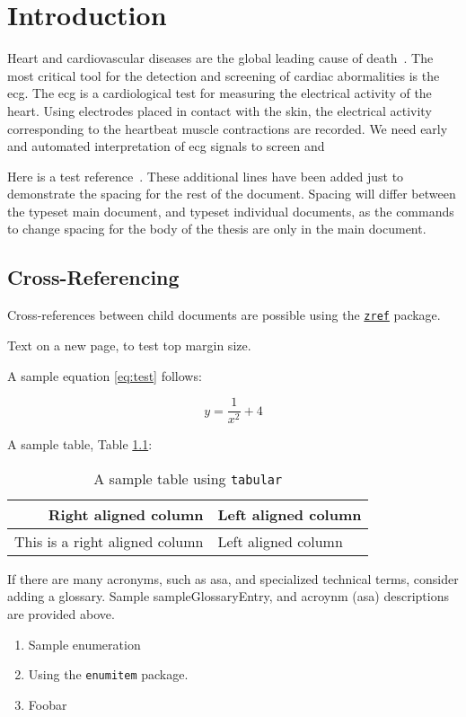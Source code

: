 \documentclass[\main/thesis.tex]{subfiles}
\begin{document}
\chapter{Introduction}

Heart and cardiovascular diseases are the global leading cause of death~\cite{doi:10.1161/CIR.0000000000000757}.
The most critical tool for the detection and screening of cardiac abormalities is the \gls{ecg}.
The \gls{ecg} is a cardiological test for measuring the electrical activity of the heart.
Using electrodes placed in contact with the skin, the electrical activity corresponding to the heartbeat muscle contractions are recorded.
We need early and automated interpretation of \gls{ecg} signals to screen and 

Here is a test reference~\cite{Knuth68:art_of_programming}.
These additional lines have been added just to demonstrate the spacing
for the rest of the document. Spacing will differ between the typeset main
document, and typeset individual documents, as the commands
to change spacing for the body of the thesis are only in the main document.

\section{Cross-Referencing}\label{sec:crossRef}

Cross-references between child documents are possible using the
\href{https://www.ctan.org/pkg/zref}{\texttt{zref}} package.

\newpage

Text on a new page, to test top margin size.

A sample equation \eqref{eq:test} follows:

\begin{equation}
y = \frac{1}{x^2} + 4 \label{eq:test}
\end{equation}

A sample table, Table \ref{tab:test}:

\begin{table}[h]
    \centering
    \begin{tabular}{r|l}
    \textbf{Right aligned column} & \textbf{Left aligned column} \\ \hline
    This is a right aligned column & Left aligned column
    \end{tabular}
    \caption{A sample table using \texttt{tabular}}
    \label{tab:test}
\end{table}

If there are many acronyms, such as \gls{asa}, and specialized technical terms, consider adding a glossary.
Sample \gls{sampleGlossaryEntry}, and acroynm (\gls{asa}) descriptions are provided above.

\begin{enumerate}[leftmargin=*,nosep]
    \item Sample enumeration
    \item Using the \texttt{enumitem} package.
    \item \eg Foobar
\end{enumerate}
\end{document}

